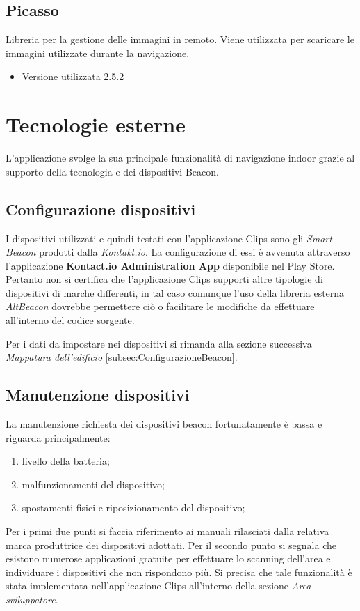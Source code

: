 \documentclass[../ManualeSviluppatore.tex]{subfiles}
\begin{document}
	\subsection{Picasso}
		Libreria per la gestione delle immagini in remoto. Viene utilizzata per scaricare le immagini utilizzate durante la navigazione.
		\begin{itemize} \item Versione utilizzata 2.5.2\end{itemize}


\section{Tecnologie esterne}
	L'applicazione svolge la sua principale funzionalità di \gls{navigazione indoor} grazie al supporto della tecnologia e dei dispositivi \gls{Beacon}.
	
	\subsection{Configurazione dispositivi}
	I dispositivi utilizzati e quindi testati con l'applicazione Clips sono gli \textit{Smart Beacon} prodotti dalla \textit{Kontakt.io}. La configurazione di essi è avvenuta attraverso l'applicazione \textbf{Kontact.io Administration App} disponibile nel Play Store. 
	Pertanto non si certifica che l'applicazione Clips supporti altre tipologie di dispositivi di marche differenti, in tal caso comunque l'uso della libreria esterna \textit{AltBeacon} dovrebbe permettere ciò o facilitare le modifiche da effettuare all'interno del codice sorgente.	
	
	Per i dati da impostare nei dispositivi si rimanda alla sezione successiva \textit{Mappatura dell'edificio} \ref{subsec:ConfigurazioneBeacon}.
	
	\subsection{Manutenzione dispositivi}
		 La manutenzione richiesta dei dispositivi beacon fortunatamente è bassa e riguarda principalmente:
		 \begin{enumerate}
		 	\item livello della batteria;
		 	\item malfunzionamenti del dispositivo;
		 	\item spostamenti fisici e riposizionamento del dispositivo;
		 \end{enumerate}
		 Per i primi due punti si faccia riferimento ai manuali rilasciati dalla relativa marca produttrice dei dispositivi adottati. Per il secondo punto si segnala che esistono numerose applicazioni gratuite per effettuare lo scanning dell'area e individuare i dispositivi che non rispondono più. Si precisa che tale funzionalità è stata implementata nell'applicazione Clips all'interno della sezione \textit{Area sviluppatore}.
		 
\end{document}

